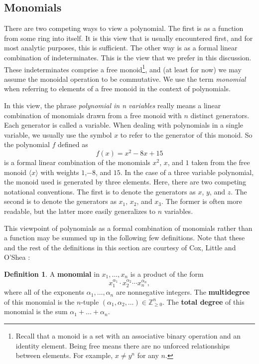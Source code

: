 \documentclass[MS, xcolor=dvipsnames]{wfuthesis}
\def\bZ{\mathbb{Z}}
\theoremstyle{definition}
\newtheorem{definition}[theorem]{Definition}
\begin{document}
\subsection{Monomials}
There are two competing ways to view a polynomial. The first is as a function from some ring into itself. It is this view that is usually encountered first, and for most analytic purposes, this is sufficient. The other way is as a formal linear combination of indeterminates. This is the view that we prefer in this discussion. These indeterminates comprise a free monoid\footnote{Recall that a monoid is a set with an associative binary operation and an identity element. Being free means there are no unforced relationships between elements. For example, $x \ne y^n$ for any $n$.}, and (at least for now) we may assume the monoidal operation to be commutative. We use the term \textit{monomial} when referring to elements of a free monoid in the context of polynomials. \par 
In this view, the phrase \textit{polynomial in n variables} really means a linear combination of monomials drawn from a free monoid with $n$ distinct generators. Each generator is called a variable. When dealing with polynomials in a single variable, we usually use the symbol $x$ to refer to the generator of this monoid. So the polynomial $f$ defined as 
\[ f(x) = x^2-8x+15 \]
is a formal linear combination of the monomials $x^2$, $x$, and $1$ taken from the free monoid $\langle x \rangle$ with weights $1$,$-8$, and $15$. In the case of a three variable polynomial, the monoid used is generated by three elements. Here, there are two competing notational conventions. The first is to denote the generators as $x$, $y$, and $z$. The second is to denote the generators as $x_1$, $x_2$, and $x_3$. The former is often more readable, but the latter more easily generalizes to $n$ variables. \par 
This viewpoint of polynomials as a formal combination of monomials rather than a function may be summed up in the following few definitions. Note that these and the rest of the definitions in this section are courtesy of Cox, Little and O'Shea \cite{Cox2015}: 
\begin{definition}
  A \textbf{monomial} in $x_1,\dots,x_n$ is a product of the form 
  \[ x_1^{\alpha_1} \cdot x_2^{\alpha_2} \cdots x_n^{\alpha_n}, \]
  where all of the exponents $\alpha_1,\dots,\alpha_n$ are nonnegative integers. The \textbf{multidegree} of this monomial is the $n$-tuple $(\alpha_1,\alpha_2,\dots) \in \bZ_{\ge0}^n$. The \textbf{total degree} of this monomial is the sum $\alpha_1 + \dots + \alpha_n$.
\end{definition}
\end{document}
